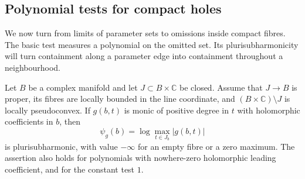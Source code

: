 \subsection{Polynomial tests for compact holes}

We now turn from limits of parameter sets to omissions inside compact fibres. The basic test measures a polynomial on the omitted set. Its plurisubharmonicity will turn containment along a parameter edge into containment throughout a neighbourhood.

\begin{lemma}
\label{lem:holes-polynomial-maximum}
Let $B$ be a complex manifold and let $J\subset B\times\mathbb{C}$ be closed. Assume that $J\to B$ is proper, its fibres are locally bounded in the line coordinate, and $(B\times\mathbb{C})\setminus J$ is locally pseudoconvex. If $g(b,t)$ is monic of positive degree in $t$ with holomorphic coefficients in $b$, then
\[
 \psi_g(b)=\log\max_{t\in J_b}|g(b,t)|
\]
is plurisubharmonic, with value $-\infty$ for an empty fibre or a zero maximum. The assertion also holds for polynomials with nowhere-zero holomorphic leading coefficient, and for the constant test $1$.
\end{lemma}

